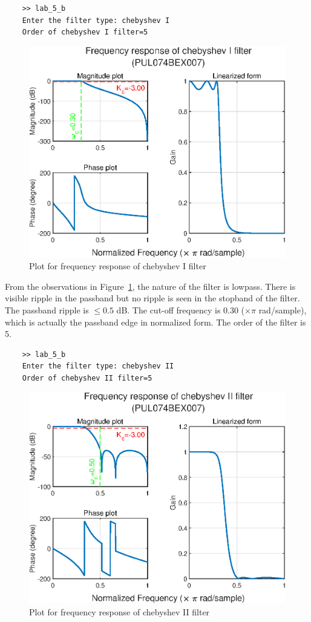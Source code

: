 \documentclass{lab_sheet}
\begin{document}
\pagebreak
{}
\begin{verbatim}
    >> lab_5_b
    Enter the filter type: chebyshev I
    Order of chebyshev I filter=5
\end{verbatim}
\begin{figure}[H]
    \centering
    \includegraphics[width=0.9\linewidth]{../Figures/chebyshev I.eps}
    \caption{Plot for frequency response of chebyshev I filter}
    \label{fig:5_2_cheby1}
\end{figure}
From the observations in Figure~\ref{fig:5_2_cheby1}, the nature of the filter is lowpass. There is visible ripple in the passband but no ripple is seen in the stopband of the filter. The passband ripple is $\leq0.5$ dB. The cut-off frequency is 0.30 ($\times \pi$ rad/sample), which is actually the passband edge in normalized form. The order of the filter is 5.  
\pagebreak
{}
\begin{verbatim}
    >> lab_5_b
    Enter the filter type: chebyshev II
    Order of chebyshev II filter=5
\end{verbatim}
\begin{figure}[H]
    \centering
    \includegraphics[width=0.9\linewidth]{../Figures/chebyshev II.eps}
    \caption{Plot for frequency response of chebyshev II filter}
    \label{fig:5_2_cheby2}
\end{figure}
\end{document}
